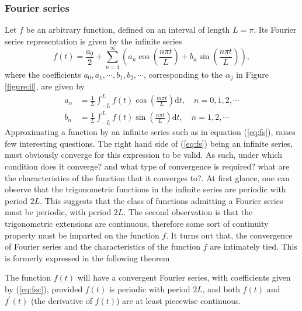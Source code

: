 \documentclass[../Main/thesis.tex]{subfiles}
\begin{document}
\justify
\subsubsection{Fourier series}
\label{sec:fouurier-serie}
 Let $f$ be an arbitrary function, defined on an interval of length $L = \pi$. Its Fourier series representation is given by the infinite series
\begin{equation}\label{eq:fs}
f(t) = \frac{a_{0}}{2} +\sum_{n=1}^{\infty}\left( a_{n} \cos\left( \frac{n\pi t}{L}\right) + b_{n} \sin\left( \frac{n\pi t}{L}\right)  \right),
 \end{equation}
where the coefficients $a_{0}, a_{1}, \cdots, b_{1}, b_{2},\cdots$, corresponding to the $\alpha_{j}$ in Figure \ref{figure:il}, are given by 
\begin{equation}\label{eq:fsc}
\begin{split}
a_{n} &= \frac{1}{L}\int_{-L}^{L}f(t)\cos\left( \frac{m\pi t}{L}\right) \mathrm{d}t,\quad n=0,1,2,\cdots\\
b_{n} &= \frac{1}{L}\int_{-L}^{L}f(t)\sin\left( \frac{n\pi t}{L}\right) \mathrm{d}t,\quad n=1,2,\cdots
\end{split}
\end{equation}
 Approximating a function by an infinite series such as in equation (\ref{eq:fs}), raises few interesting questions. The right hand side of (\ref{eq:fs}) being an infinite series, must obviously converge for this expression to be valid. As such, under which condition does it converge? and what type of convergence is required? what are the characteristics of the function that it converges to?.
\justify
At first glance, one can observe that the trigonometric functions in the infinite series are periodic with period $2L$. This suggests that the class of functions admitting a Fourier series must be periodic, with period $2L$. The second observation is that the trigonometric extensions are continuous, therefore some sort of continuity property must be imparted on the function $f$. It turns out that, the convergence of Fourier series and the characteristics of the function $f$ are intimately tied. This is formerly expressed in the following theorem
\begin{theorem}\label{thm:conv}
	The function $f(t)$ will  have a convergent Fourier series, with coefficients given by (\ref{eq:fsc}), provided $f(t)$ is periodic with period $2L$, and both $f(t)$ and $f^{\prime}(t)$ (the derivative of $f(t)$) are at least piecewise continuous.
\end{theorem}
\justify
\end{document}
